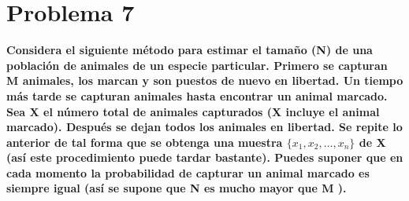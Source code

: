 \section*{Problema 7}

\textbf{Considera el siguiente método para estimar el tamaño (N) de una población de animales de un especie particular. Primero se capturan M animales, los marcan y son puestos de nuevo en libertad. Un tiempo más tarde se capturan animales hasta encontrar un animal marcado. Sea X el número total de animales capturados (X incluye el animal marcado). Después se dejan todos los animales en libertad. Se repite lo anterior de tal forma que se obtenga una muestra $\{x_1,x_2,\dots,x_n\}$ de X (así este procedimiento puede tardar bastante). Puedes suponer que en cada momento la probabilidad de capturar un animal marcado es siempre igual (así se supone que N es mucho mayor que M ).
}

